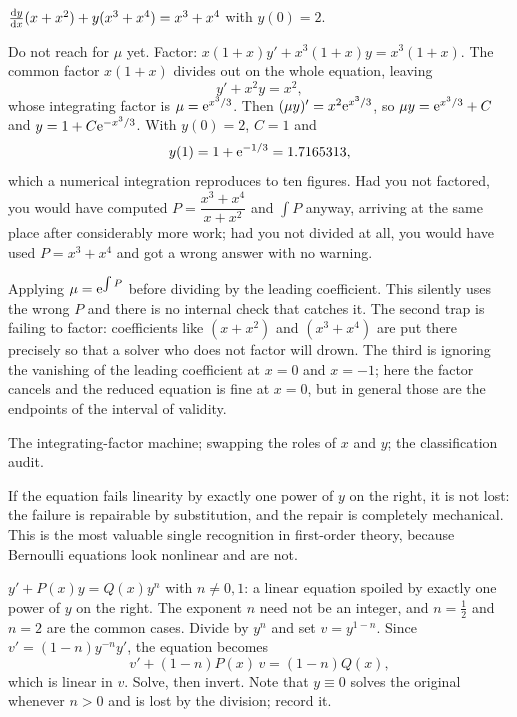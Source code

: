 \begin{worked}
$\frac{\mathrm{d}y}{\mathrm{d}x}(x+x^{2})+y(x^{3}+x^{4})=x^{3}+x^{4}$ with $y(0)=2$.

Do not reach for $\mu$ yet. Factor: $x(1+x)y'+x^{3}(1+x)y=x^{3}(1+x)$. The common factor $x(1+x)$ divides out on the whole equation, leaving
\[y'+x^{2}y=x^{2},\]
whose integrating factor is $\mu=\mathrm{e}^{x^{3}/3}$. Then $(\mu y)'=x^{2}\mathrm{e}^{x^{3}/3}$, so $\mu y=\mathrm{e}^{x^{3}/3}+C$ and $y=1+C\mathrm{e}^{-x^{3}/3}$. With $y(0)=2$, $C=1$ and
\[y(1)=1+\mathrm{e}^{-1/3}=1.7165313,\]
which a numerical integration reproduces to ten figures. Had you not factored, you would have computed $P=\dfrac{x^{3}+x^{4}}{x+x^{2}}$ and $\int P$ anyway, arriving at the same place after considerably more work; had you not divided at all, you would have used $P=x^{3}+x^{4}$ and got a wrong answer with no warning.
\end{worked}

\begin{trap}
Applying $\mu=\mathrm{e}^{\int P}$ before dividing by the leading coefficient. This silently uses the wrong $P$ and there is no internal check that catches it. The second trap is failing to factor: coefficients like $(x+x^{2})$ and $(x^{3}+x^{4})$ are put there precisely so that a solver who does not factor will drown. The third is ignoring the vanishing of the leading coefficient at $x=0$ and $x=-1$; here the factor cancels and the reduced equation is fine at $x=0$, but in general those are the endpoints of the interval of validity.
\end{trap}

\begin{seealsob}The integrating-factor machine; swapping the roles of $x$ and $y$; the classification audit.\end{seealsob}

If the equation fails linearity by exactly one power of $y$ on the right, it is not lost: the failure is repairable by substitution, and the repair is completely mechanical. This is the most valuable single recognition in first-order theory, because Bernoulli equations look nonlinear and are not.

\cue $y'+P(x)y=Q(x)y^{n}$ with $n\neq0,1$: a linear equation spoiled by exactly one power of $y$ on the right. The exponent $n$ need not be an integer, and $n=\tfrac12$ and $n=2$ are the common cases.
\method Divide by $y^{n}$ and set $v=y^{1-n}$. Since $v'=(1-n)y^{-n}y'$, the equation becomes
\[v'+(1-n)P(x)\,v=(1-n)Q(x),\]
which is linear in $v$. Solve, then invert. Note that $y\equiv0$ solves the original whenever $n>0$ and is lost by the division; record it.

